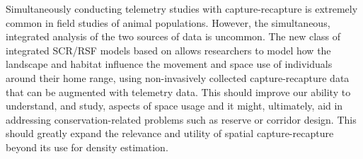 Simultaneously conducting telemetry studies with capture-recapture is
extremely common in field studies of animal populations. However, the
simultaneous, integrated analysis of the two sources of data is uncommon.
 The new class of integrated SCR/RSF models based on 
\citet{royle_etal:2012mee} allows researchers to model how the
landscape and habitat influence the movement and space use of
individuals around their home range, using non-invasively collected
capture-recapture data that can be augmented with telemetry data.
This should improve our ability to understand, and study, aspects of
space usage and it might, ultimately, aid in addressing
conservation-related problems such as reserve or corridor design. This
 should greatly expand the relevance and utility of spatial
capture-recapture beyond its use for density estimation.






























